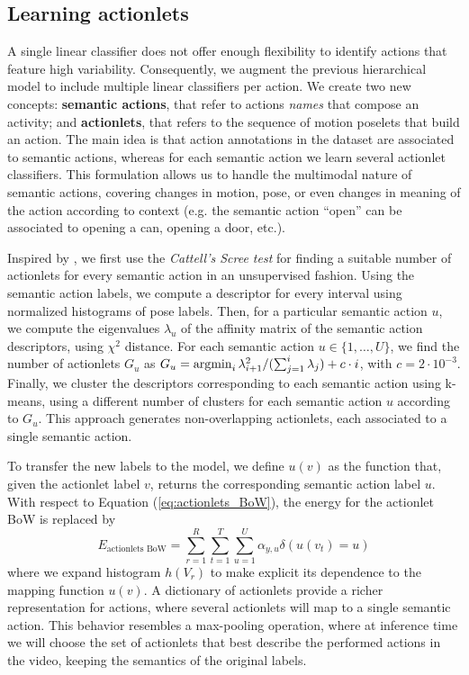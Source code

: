 \subsection{Learning actionlets}
A single linear classifier does not offer enough flexibility to identify actions 
that feature high variability. Consequently, we augment the previous 
hierarchical model to include multiple linear classifiers per action. We create 
two new concepts: \textbf{semantic actions}, that refer to actions \emph{names} 
that compose an activity; and \textbf{actionlets}, that refers to the sequence 
of motion poselets that build an action. The main idea is that action 
annotations in the dataset are associated to semantic actions, whereas for each 
semantic action we learn several actionlet classifiers. This formulation allows 
us to handle the multimodal nature of semantic actions, covering changes in 
motion, pose, or even changes in meaning of the action according to context 
(e.g. the semantic action ``open'' can be associated to opening a can, opening a 
door, etc.). 

Inspired by \cite{Raptis2012}, we first use the \emph{Cattell's Scree test} for 
finding a suitable number of actionlets for every semantic action in an unsupervised fashion. Using 
the semantic action labels, we compute a descriptor for every interval using 
normalized histograms of pose labels. Then, for a particular semantic action 
$u$, we compute the eigenvalues $\lambda_u$ of the affinity matrix of the 
semantic action descriptors, using $\chi^2$ distance. For each semantic action 
$u \in \{1,\dots,U\}$, we find the number of actionlets $G_u$ as $G_u = 
\operatorname*{argmin}_i \lambda_{i+1}^2 / (\sum_{j=1}^i \lambda_j) + c\cdot i$, with $c=2\cdot 
10^{-3}$. Finally, we cluster the descriptors corresponding to each semantic 
action using k-means, using a different number of clusters for each semantic 
action $u$ according to $G_u$. This approach generates non-overlapping actionlets, each associated to a single semantic action.

To transfer the new labels to the model, we define $u(v)$ as the function that, 
given the actionlet label $v$, returns the corresponding semantic action 
label $u$. With respect to Equation (\ref{eq:actionlets_BoW}), the energy for 
the actionlet BoW is replaced by
{\small
\begin{equation}
E_{\text{actionlets BoW}} =  \sum_{r=1}^R\sum_{t=1}^T\sum_{u=1}^U \alpha_{y,u}\delta(u(v_t)=u)
\end{equation}}
where we expand histogram $h(V_r)$ to 
make explicit its dependence to the mapping function $u(v)$. A 
dictionary of actionlets provide a richer representation for actions, 
where several actionlets will map to a single semantic action. This 
behavior resembles a max-pooling operation, where at inference time we will 
choose the set of actionlets that best describe the performed actions in the 
video, keeping the semantics of the original labels. 

